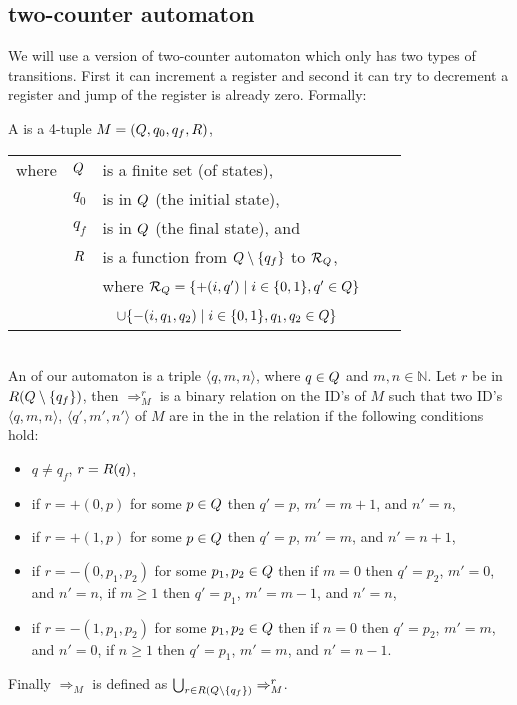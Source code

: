 \subsection{two-counter automaton} %
We will use a version of two-counter automaton which only has two types of transitions. First it can increment a register and second it can try to decrement a register and jump of the register is already zero. Formally:
\begin{definition}
	A  is a 4-tuple $M=(Q,q_0,q_f,R)$,
	\begin{tabular}{llp{0.78\linewidth}}
		where & $Q$      & is a finite set (of states),\\
		      & $q_0$ & is in $Q$ (the initial state),\\
		      & $q_f$ & is in $Q$ (the final state), and\\
		      & $R$ & is a function from $Q\setminus\{q_f\}$ to $\mathcal{R}_\autStates$,\\
		      & & where $\mathcal{R}_{Q}=\{+(i,q')\mid i\in\{0,1\},q'\in Q\}$\\
		      & &~ \hphantom{where $\mathcal{R}_\autStates$}$\cup\{-(i,q_1,q_2)\mid i\in\{0,1\},q_1,q_2\in Q\}$
	\end{tabular}\\
	An  of our automaton is a triple $\langle q,m,n\rangle$, where $q\in Q$ and $m,n\in\mathbb{N}$.
	Let $r$ be in $R(Q\setminus\{q_f\})$, then $\Rightarrow^r_M$ is a binary relation on the ID's of $M$ such that two ID's $\langle q,m,n\rangle$, $\langle q',m',n'\rangle$ of $M$ are in the in the relation if the following conditions hold:
	\begin{itemize}
		\item $q\neq q_f$, $r=R(q)$,
		\item if $r=+(0,p)$ for some $p\in Q$ then $q'=p$, $m'=m+1$, and $n'=n$,
		\item if $r=+(1,p)$ for some $p\in Q$ then $q'=p$, $m'=m$, and $n'=n+1$,
		\item if $r=-(0,p_1,p_2)$ for some $p_1,p_2\in Q$ then
			\subitem if $m=0$ then $q'=p_2$, $m'=0$, and $n'=n$,
			\subitem if $m\geq1$ then $q'=p_1$, $m'=m-1$, and $n'=n$,
		\item if $r=-(1,p_1,p_2)$ for some $p_1,p_2\in Q$ then
			\subitem if $n=0$ then $q'=p_2$, $m'=m$, and $n'=0$,
			\subitem if $n\geq1$ then $q'=p_1$, $m'=m$, and $n'=n-1$.
	\end{itemize}
	Finally $\Rightarrow_M$ is defined as $\bigcup_{r\in R(Q\setminus\{q_f\})}\Rightarrow^r_M$.
\end{definition}